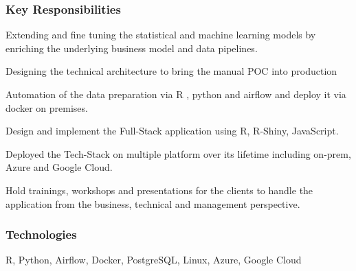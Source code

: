 \documentclass[letter,10pt]{article}
\begin{document}
\subsubsection*{{Key Responsibilities}}
\begin{zitemize} 
	\item Extending and fine tuning the statistical and machine learning models by enriching the underlying business model and data pipelines. 
	\item Designing the technical architecture to bring the manual POC into production 
	\item Automation of the data preparation via R , python and airflow and deploy it via docker on premises. 
	\item Design and implement the Full-Stack application using R, R-Shiny, JavaScript.     
	\item Deployed the Tech-Stack on multiple platform over its lifetime including on-prem, Azure and Google Cloud.
	\item Hold trainings, workshops and presentations for the clients to handle the application from the business, technical and management perspective. 

\end{zitemize}


\subsubsection*{{Technologies}}
R, Python, Airflow, Docker, PostgreSQL, Linux, Azure, Google Cloud
\end{document}
